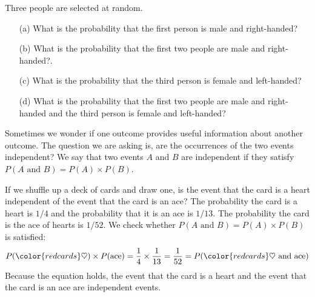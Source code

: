 \begin{exercisewrap}
\begin{nexercise}
Three people are selected at random.\footnotemark \vspace{-1.5mm}
\begin{enumerate}
\setlength{\itemsep}{0mm}
\item[(a)] What is the probability that the first person is male and right-handed?
\item[(b)] What is the probability that the first two people are male and right-handed?.
\item[(c)] What is the probability that the third person is female and left-handed?
\item[(d)] What is the probability that the first two people are male and right-handed and the third person is female and left-handed?
\end{enumerate}
\end{nexercise}
\end{exercisewrap}

Sometimes we wonder if one outcome provides useful information about another outcome. The question we are asking is, are the occurrences of the two events independent? We say that two events $A$ and $B$ are independent if they satisfy
$P(A \text{ and }B) = P(A) \times  P(B)$.

\begin{examplewrap}
\begin{nexample}{If we shuffle up a deck of cards and draw one, is the event that the card is a heart independent of the event that the card is an ace?}
The probability the card is a heart is $1/4$ and the probability that it is an ace is $1/13$. The probability the card is the ace of hearts is $1/52$.
We check whether $P(A \text{ and }B) = P(A) \times  P(B)$
is satisfied:
\begin{align*}
P({\color{redcards}\heartsuit})\times P(\text{ace}) = \frac{1}{4}\times \frac{1}{13} = \frac{1}{52} 
					= P({\color{redcards}\heartsuit}\text{ and ace})
\end{align*}
Because the equation holds, the event that the card is a heart and the event that the card is an ace are independent events.
\end{nexample}
\end{examplewrap}




